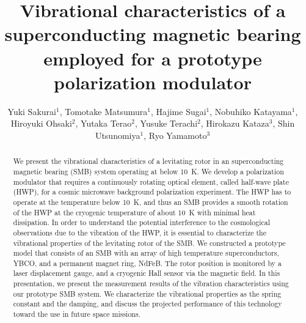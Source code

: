 \documentclass[a4paper,11pt]{jpconf}
\begin{document}
\title{Vibrational characteristics of a superconducting magnetic bearing employed for a prototype polarization modulator}

\author{Yuki Sakurai$^{1}$, Tomotake Matsumura$^{1}$, Hajime Sugai$^{1}$, Nobuhiko Katayama$^{1}$, Hiroyuki Ohsaki$^{2}$, Yutaka Terao$^{2}$, Yusuke Terachi$^{2}$, Hirokazu Kataza$^{3}$, Shin Utsunomiya$^{1}$, Ryo Yamamoto$^{3}$}
\vspace{2mm}
\address{
$^{1}$Kavli Institute for the Physics and Mathematics of the Universe (WPI),The University of Tokyo Institutes for Advanced Study, The University of Tokyo, 5-1-5 Kashiwanoha, Kashiwa, Chiba 277-8583, Japan \\
$^{2}$Graduate School of Frontier Sciences, The University of Tokyo, 5-1-5 Kashiwanoha, Kashiwa, Chiba 277-8561, Japan \\
$^{3}$Japan Aerospace Exploration Agency, Institute of Space and Astronautical Science (ISAS), 3-1-1 Yoshinodai, Chuo-ku, Sagamihara, Kanagawa 252-5210, Japan
}


\begin{abstract}
We present the vibrational characteristics of a levitating rotor in an superconducting magnetic bearing (SMB) system operating at below 10~K.
We develop a polarization modulator that requires a continuously rotating optical element, called half-wave plate (HWP), for a cosmic microwave background polarization experiment.
The HWP has to operate at the temperature below 10~K, and thus an SMB provides a smooth rotation of the HWP at the cryogenic temperature of about 10~K with minimal heat dissipation.
In order to understand the potential interference to the cosmological observations due to the vibration of the HWP,
it is essential to characterize the vibrational properties of the levitating rotor of the SMB.
We constructed a prototype model that consists of an SMB with an array of high temperature superconductors, YBCO, and a permanent magnet ring, NdFeB.
The rotor position is monitored by a laser displacement gauge, and a cryogenic Hall sensor via the magnetic field.
In this presentation, we present the measurement results of the vibration characteristics using our prototype SMB system.
We characterize the vibrational properties as the spring constant and the damping, and discuss the projected performance of this technology toward the use in future space missions.
\end{abstract}
\end{document}
